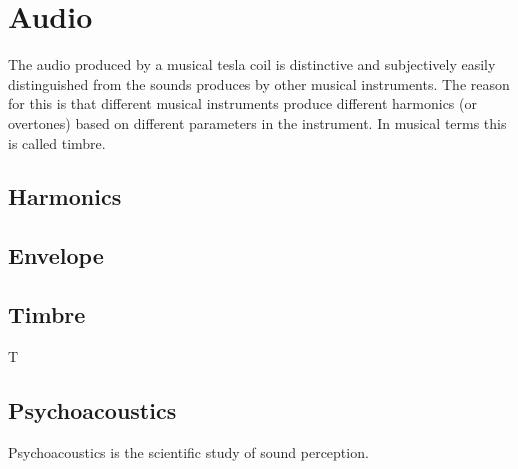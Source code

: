 \section{Audio}

The audio produced by a musical tesla coil is distinctive and subjectively easily distinguished from the sounds produces by other musical instruments. The reason for this is that different musical instruments produce different harmonics (or overtones) based on different parameters in the instrument. In musical terms this is called timbre.

\subsection{Harmonics}

\subsection{Envelope}

\subsection{Timbre}
T

\subsection{Psychoacoustics}
Psychoacoustics is the scientific study of sound perception.


